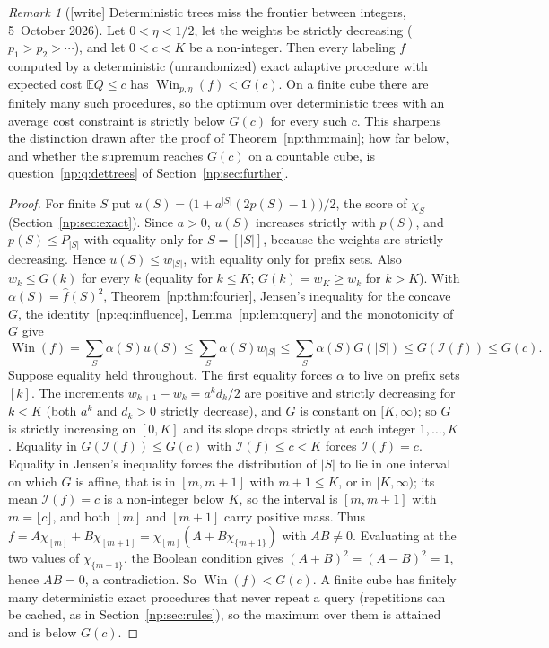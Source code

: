 \documentclass[11pt,a4paper]{article}
\theoremstyle{definition}
\theoremstyle{remark}
\newtheorem{remark}[theorem]{Remark}
\newcommand{\E}{\mathbb E}
\newcommand{\Win}{\operatorname{Win}}
\begin{document}
\begin{remark}[{[write]} Deterministic trees miss the frontier between integers, 5~October 2026]
\label{np:rem:deterministic}
Let \(0<\eta<1/2\), let the weights be strictly decreasing
(\(p_1>p_2>\cdots\)), and let \(0<c<K\) be a non-integer. Then every
labeling \(f\) computed by a deterministic (unrandomized) exact adaptive
procedure with expected cost \(\E Q\le c\) has
\(\Win_{p,\eta}(f)<G(c)\). On a finite cube there are finitely many such
procedures, so the optimum over deterministic trees with an average cost
constraint is strictly below \(G(c)\) for every such \(c\). This sharpens
the distinction drawn after the proof of Theorem~\ref{np:thm:main}; how
far below, and whether the supremum reaches \(G(c)\) on a countable cube,
is question~\ref{np:q:dettrees} of Section~\ref{np:sec:further}.
\end{remark}
\begin{proof}
For finite \(S\) put \(u(S)=\bigl(1+a^{|S|}(2p(S)-1)\bigr)/2\), the score of
\(\chi_S\) (Section~\ref{np:sec:exact}). Since \(a>0\), \(u(S)\) increases
strictly with \(p(S)\), and \(p(S)\le P_{|S|}\) with equality only for
\(S=[|S|]\), because the weights are strictly decreasing. Hence
\(u(S)\le w_{|S|}\), with equality only for prefix sets. Also
\(w_k\le G(k)\) for every \(k\) (equality for \(k\le K\); \(G(k)=w_K\ge
w_k\) for \(k>K\)). With \(\alpha(S)=\widehat f(S)^2\),
Theorem~\ref{np:thm:fourier}, Jensen's inequality for the concave \(G\),
the identity~\eqref{np:eq:influence}, Lemma~\ref{np:lem:query} and the
monotonicity of \(G\) give
\[
 \Win(f)=\sum_S\alpha(S)u(S)\le\sum_S\alpha(S)w_{|S|}
 \le\sum_S\alpha(S)G(|S|)\le G(\mathcal I(f))\le G(c).
\]
Suppose equality held throughout. The first equality forces \(\alpha\) to
live on prefix sets \([k]\). The increments \(w_{k+1}-w_k=a^kd_k/2\) are
positive and strictly decreasing for \(k<K\) (both \(a^k\) and \(d_k>0\)
strictly decrease), and \(G\) is constant on \([K,\infty)\); so \(G\) is
strictly increasing on \([0,K]\) and its slope drops strictly at each
integer \(1,\dots,K\). Equality in \(G(\mathcal I(f))\le G(c)\) with
\(\mathcal I(f)\le c<K\) forces \(\mathcal I(f)=c\). Equality in Jensen's
inequality forces the distribution of \(|S|\) to lie in one interval on
which \(G\) is affine, that is in \([m,m+1]\) with \(m+1\le K\), or in
\([K,\infty)\); its mean \(\mathcal I(f)=c\) is a non-integer below \(K\),
so the interval is \([m,m+1]\) with \(m=\lfloor c\rfloor\), and both
\([m]\) and \([m+1]\) carry positive mass. Thus
\(f=A\chi_{[m]}+B\chi_{[m+1]}=\chi_{[m]}(A+B\chi_{\{m+1\}})\) with
\(AB\ne0\). Evaluating at the two values of \(\chi_{\{m+1\}}\), the Boolean
condition gives \((A+B)^2=(A-B)^2=1\), hence \(AB=0\), a contradiction. So
\(\Win(f)<G(c)\). A finite cube has finitely many deterministic exact
procedures that never repeat a query (repetitions can be cached, as in
Section~\ref{np:sec:rules}), so the maximum over them is attained and is
below \(G(c)\).
\end{proof}
\end{document}
